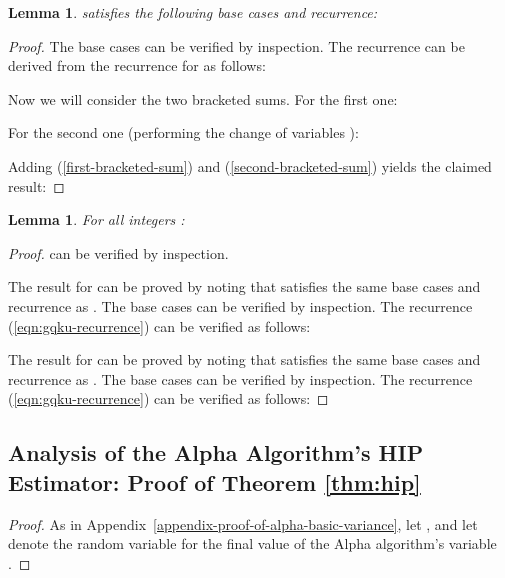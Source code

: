 \documentclass{article}
\newtheorem{lemma}[theorem]{Lemma}
\begin{document}
\begin{lemma}\label{lemma:gqku-recurrences}
 satisfies the following base cases and recurrence:

\end{lemma}
\begin{proof}
The base cases can be verified by inspection. The recurrence can be derived from the
recurrence for  as follows:
 
\noindent Now we will consider the two bracketed sums. For the first one:

\noindent For the second one (performing the change of variables ):

\noindent Adding (\ref{first-bracketed-sum}) and (\ref{second-bracketed-sum})
yields the claimed result:

\end{proof}

\begin{lemma}\label{lemma:gqku-formulas}
For all integers : 

\end{lemma}
\begin{proof}
 can be verified by inspection.

\vspace{0.5em}
\noindent The result for  can be proved by noting that
 satisfies the same base cases and recurrence as .
The base cases can be verified by inspection. The recurrence (\ref{eqn:gqku-recurrence})
can be verified as follows:


\vspace{0.5em}
\noindent The result for  can be proved by noting that
 satisfies the same base cases and recurrence as .
The base cases can be verified by inspection. The recurrence (\ref{eqn:gqku-recurrence})
can be verified as follows:

\end{proof}

\subsection{Analysis of the Alpha Algorithm's HIP Estimator: Proof of Theorem \ref{thm:hip}}
\label{app:hip}

\begin{proof}
As in Appendix~\ref{appendix-proof-of-alpha-basic-variance}, let
 , and let  denote the random variable
for the final value of the Alpha algorithm's variable .

\end{proof}
\end{document}
